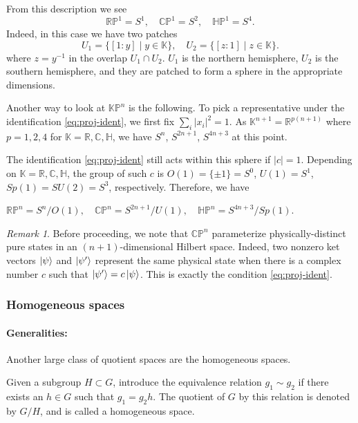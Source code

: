 \documentclass[12pt]{article}
\numberwithin{equation}{section}
\numberwithin{figure}{section}
\theoremstyle{remark}
\newtheorem{remark}[definition]{Remark}
\def\bC{\mathbb{C}}
\def\bH{\mathbb{H}}
\def\bK{\mathbb{K}}
\def\bR{\mathbb{R}}
\def\RP{\mathbb{RP}}
\def\CP{\mathbb{CP}}
\def\HP{\mathbb{HP}}
\def\KP{\mathbb{KP}}
\begin{document}
From this description we see \begin{equation}
\RP^1=S^1,\quad
\CP^1=S^2,\quad
\HP^1=S^4.
\label{eq:KP1}
\end{equation}
Indeed, in this case we have two patches \begin{equation}
  U_1 = \{ [1:y] \mid y\in \bK \}, \quad U_2 = \{ [z:1] \mid z\in \bK \}.
\end{equation} where $z=y^{-1}$ in the overlap $U_1\cap U_2$.
$U_1$ is the northern hemisphere,
$U_2$ is the southern hemisphere,
and they are patched to form a sphere in the appropriate dimensions.

Another way to look at $\KP^n$ is the following. 
To pick a representative under the identification \eqref{eq:proj-ident},
we first fix $\sum_i |x_i|^2 =1$.
As $\bK^{n+1}=\bR^{p(n+1)}$ where $p=1,2,4$ for $\bK=\bR,\bC,\bH$,
we have $S^n$, $S^{2n+1}$, $S^{4n+3}$ at this point.

The identification \eqref{eq:proj-ident} still acts within this sphere
if $|c|=1$. 
Depending on $\bK=\bR,\bC,\bH$, the group of such $c$ is $O(1)=\{\pm1\}=S^0$, $U(1)=S^1$, $Sp(1)=SU(2)=S^3$, respectively.
Therefore, we have \begin{proposition}
\label{prop:sphere-proj}
$\RP^n=S^n/O(1), \quad \CP^n=S^{2n+1}/U(1), \quad \HP^n=S^{4n+3}/Sp(1)$.
\end{proposition}

\begin{remark}
Before proceeding, we note that $\CP^n$ parameterize physically-distinct pure states 
in an $(n+1)$-dimensional Hilbert space.
Indeed, two nonzero ket vectors $\ket{\psi}$ and $\ket{\psi'}$ represent the same physical state
when there is a complex number $c$ such that $\ket{\psi'}=c\ket{\psi}$.
This is exactly the condition \eqref{eq:proj-ident}.
\end{remark}


\subsubsection{Homogeneous spaces}
\label{sec:homogeneous}
\paragraph{Generalities:}
Another large class of quotient spaces
are the homogeneous spaces.
\begin{definition}
  \label{def:homogeneous-space}
  Given a subgroup $H\subset G$,
  introduce the equivalence relation $g_1\sim g_2$ if 
  there exists an $h\in G$ such that $g_1=g_2 h$.
  The quotient of $G$ by this relation is denoted by $G/H$,
  and is called a homogeneous space.
\end{definition}
\end{document}
